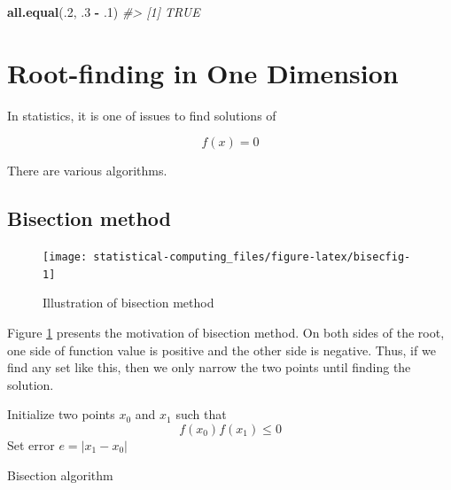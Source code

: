 \documentclass[]{book}
\newenvironment{Shaded}{\begin{snugshade}}{\end{snugshade}}
\newcommand{\CommentTok}[1]{\textcolor[rgb]{0.56,0.35,0.01}{\textit{#1}}}
\newcommand{\DecValTok}[1]{\textcolor[rgb]{0.00,0.00,0.81}{#1}}
\newcommand{\FloatTok}[1]{\textcolor[rgb]{0.00,0.00,0.81}{#1}}
\newcommand{\KeywordTok}[1]{\textcolor[rgb]{0.13,0.29,0.53}{\textbf{#1}}}
\newcommand{\NormalTok}[1]{#1}
\newcommand{\OperatorTok}[1]{\textcolor[rgb]{0.81,0.36,0.00}{\textbf{#1}}}
\newcommand{\StringTok}[1]{\textcolor[rgb]{0.31,0.60,0.02}{#1}}
\theoremstyle{definition}
\theoremstyle{definition}
\theoremstyle{definition}
\theoremstyle{remark}
\begin{document}
\begin{Shaded}
\begin{Highlighting}[]
\KeywordTok{all.equal}\NormalTok{(.}\DecValTok{2}\NormalTok{, }\FloatTok{.3} \OperatorTok{-}\StringTok{ }\FloatTok{.1}\NormalTok{)}
\CommentTok{#> [1] TRUE}
\end{Highlighting}
\end{Shaded}

\hypertarget{root-finding-in-one-dimension}{%
\section{Root-finding in One Dimension}\label{root-finding-in-one-dimension}}

In statistics, it is one of issues to find solutions of

\[f(x) = 0\]

There are various algorithms.

\hypertarget{bisection-method}{%
\subsection{Bisection method}\label{bisection-method}}

\begin{figure}[H]

{\centering \texttt{[image: statistical-computing\_files/figure-latex/bisecfig-1]} 

}

\caption{Illustration of bisection method}\label{fig:bisecfig}
\end{figure}

Figure \ref{fig:bisecfig} presents the motivation of bisection method. On both sides of the root, one side of function value is positive and the other side is negative. Thus, if we find any set like this, then we only narrow the two points until finding the solution.

\begin{algorithm}[H] \label{alg:bisection}
  \SetAlgoLined
  Initialize two points $x_0$ and $x_1$ such that $$f(x_0) f(x_1) \le 0$$\;
  Set error $e = \lvert x_1 - x_0 \rvert$\;
  \caption{Bisection algorithm}
\end{algorithm}
\end{document}

